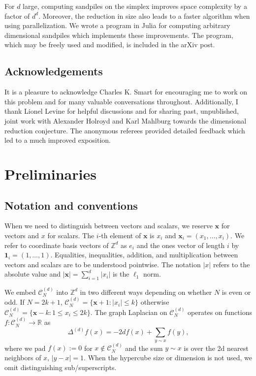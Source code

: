 \documentclass[12pt]{amsart}
\newcommand{\Z}{\mathbb{Z}}
\begin{document}
	For $d$ large, computing sandpiles on the simplex improves space complexity by a factor of $d^d$. Moreover, the reduction in size also leads to a faster algorithm when using parallelization. We wrote a program in Julia \cite{bezanson2017julia, besard2018effective} for computing arbitrary dimensional sandpiles which implements these improvements. The program, which may be freely used and modified, is included in the arXiv post. 
	
	
	\subsection*{Acknowledgements}	
	It is a pleasure to acknowledge Charles K. Smart for encouraging me to work on this problem and for many valuable conversations throughout.
	Additionally, I thank Lionel Levine for helpful discussions and for sharing past, unpublished, joint work with Alexander Holroyd and Karl Mahlburg towards the dimensional reduction conjecture. The anonymous referees provided detailed feedback which led to a much improved exposition.
	
	
	\section{Preliminaries} \label{sec:prelims}
	
	
	\subsection{Notation and conventions}
	When we need to distinguish between vectors and scalars, we reserve $\mathbf{x}$
	for vectors and $x$ for scalars. The $i$-th element of $\mathbf{x}$ is $x_i$
	and $\mathbf{x}_{i} = (x_1, \ldots, x_i)$. We refer to coordinate basis vectors of 
	$\Z^d$ as $e_i$ and the ones vector of length $i$ by
	$\mathbf{1}_{i} = (1, \ldots, 1)$. Equalities, inequalities, addition, and multiplication between vectors and scalars are to be understood pointwise. 
	The notation $|x|$ refers to the absolute value and $|\mathbf{x}| = \sum_{i=1}^d |x_i|$ is the $\ell_1$ norm. 
	
	
	We embed $\mathcal{C}_{N}^{(d)}$ into $\Z^d$ in two different ways depending on whether $N$ is even or odd. If $N = 2 k + 1$,  $\mathcal{C}_N^{(d)} = \{ \mathbf{x} +1 : |x_i| \leq k \}$  otherwise $\mathcal{C}_N^{(d)} = \{ \mathbf{x}-k : 1 \leq x_i \leq 2 k \}$.
	The graph Laplacian on $\mathcal{C}_N^{(d)}$ operates on functions
	$f: \mathcal{C}_N^{(d)} \to \mathbb{R}$ as 
	\begin{equation}
	\Delta^{(d)} f(x) = -2 d f(x) + \sum_{y \sim x} f(y), 
	\end{equation}
	where we pad $f(x) := 0$ for $x \not \in \mathcal{C}_N^{(d)}$ and the 
	sum $y \sim x$ is over the 2d nearest neighbors of $x$, $|y-x| = 1$.  When the hypercube size or dimension is not used, we omit distinguishing sub/superscripts. 
	
\end{document}
